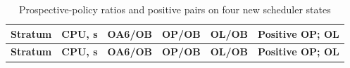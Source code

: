 \documentclass[pdflatex,sn-basic,Numbered]{sn-jnl}
\begin{document}
\begin{longtable}[]{@{}
  >{\raggedright\arraybackslash}p{}
  >{\raggedleft\arraybackslash}p{}
  >{\raggedleft\arraybackslash}p{}
  >{\raggedleft\arraybackslash}p{}
  >{\raggedleft\arraybackslash}p{}
  >{\raggedright\arraybackslash}p{}@{}}
\caption{Prospective-policy ratios and positive pairs on four new scheduler states}\label{tab:26}\tabularnewline
\toprule\noalign{}
\begin{minipage}[b]{\linewidth}\raggedright
\textbf{Stratum}
\end{minipage} & \begin{minipage}[b]{\linewidth}\raggedleft
\textbf{CPU, s}
\end{minipage} & \begin{minipage}[b]{\linewidth}\raggedleft
\textbf{OA6/OB}
\end{minipage} & \begin{minipage}[b]{\linewidth}\raggedleft
\textbf{OP/OB}
\end{minipage} & \begin{minipage}[b]{\linewidth}\raggedleft
\textbf{OL/OB}
\end{minipage} & \begin{minipage}[b]{\linewidth}\raggedright
\textbf{Positive OP; OL}
\end{minipage} \\
\midrule\noalign{}
\endfirsthead
\toprule\noalign{}
\begin{minipage}[b]{\linewidth}\raggedright
\textbf{Stratum}
\end{minipage} & \begin{minipage}[b]{\linewidth}\raggedleft
\textbf{CPU, s}
\end{minipage} & \begin{minipage}[b]{\linewidth}\raggedleft
\textbf{OA6/OB}
\end{minipage} & \begin{minipage}[b]{\linewidth}\raggedleft
\textbf{OP/OB}
\end{minipage} & \begin{minipage}[b]{\linewidth}\raggedleft
\textbf{OL/OB}
\end{minipage} & \begin{minipage}[b]{\linewidth}\raggedright
\textbf{Positive OP; OL}
\end{minipage} \\

\end{longtable}
\end{document}
